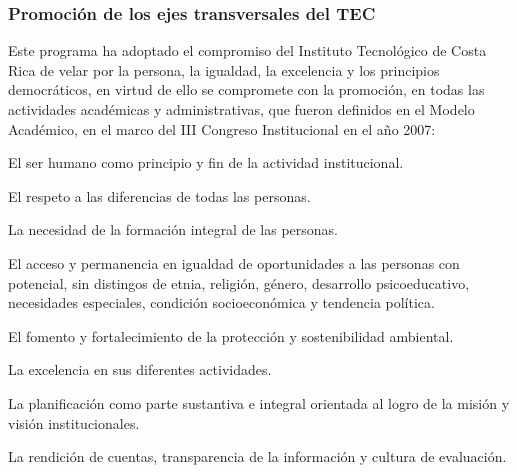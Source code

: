 \subsubsection*{Promoción de los ejes transversales del TEC}

Este programa ha adoptado el compromiso del Instituto Tecnológico de Costa Rica de velar por la persona, la igualdad, la excelencia y los principios democráticos, en virtud de ello se compromete con la promoción, en todas las actividades académicas y administrativas, que fueron definidos en el Modelo Académico, en el marco del III Congreso Institucional en el año 2007:\par

\begin{cuadrocafe}[EJT01]
El ser humano como principio y fin de la actividad institucional.
\end{cuadrocafe}

\begin{cuadrocafe}[EJT02]
El respeto a las diferencias de todas las personas.
\end{cuadrocafe}

\begin{cuadrocafe}[EJT03]
La necesidad de la formación integral de las personas.
\end{cuadrocafe}

\begin{cuadrocafe}[EJT04]
El acceso y permanencia en igualdad de oportunidades a las personas con potencial, sin distingos de etnia, religión, género, desarrollo psicoeducativo, necesidades especiales, condición socioeconómica y tendencia política.
\end{cuadrocafe}

\begin{cuadrocafe}[EJT05]
El fomento y fortalecimiento de la protección y sostenibilidad ambiental.
\end{cuadrocafe}

\begin{cuadrocafe}[EJT06]
La excelencia en sus diferentes actividades.
\end{cuadrocafe}

\begin{cuadrocafe}[EJT07]
La planificación como parte sustantiva e integral orientada al logro de la misión y visión institucionales.
\end{cuadrocafe}

\begin{cuadrocafe}[EJT08]
La rendición de cuentas, transparencia de la información y cultura de evaluación.
\end{cuadrocafe}


